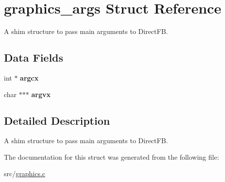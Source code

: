 \hypertarget{structgraphics__args}{}\section{graphics\+\_\+args Struct Reference}
\label{structgraphics__args}


A shim structure to pass main arguments to Direct\+FB.  


\subsection*{Data Fields}
\begin{DoxyCompactItemize}
\item 
int $\ast$ {\bfseries argcx}\hypertarget{structgraphics__args_a0640ba707b2b114d93bc91b2b3bd19b1}{}\label{structgraphics__args_a0640ba707b2b114d93bc91b2b3bd19b1}

\item 
char $\ast$$\ast$$\ast$ {\bfseries argvx}\hypertarget{structgraphics__args_a21430c98338f0499c5861c3dd2b85a66}{}\label{structgraphics__args_a21430c98338f0499c5861c3dd2b85a66}

\end{DoxyCompactItemize}


\subsection{Detailed Description}
A shim structure to pass main arguments to Direct\+FB. 

The documentation for this struct was generated from the following file\+:\begin{DoxyCompactItemize}
\item 
src/\hyperlink{graphics_8c}{graphics.\+c}\end{DoxyCompactItemize}
